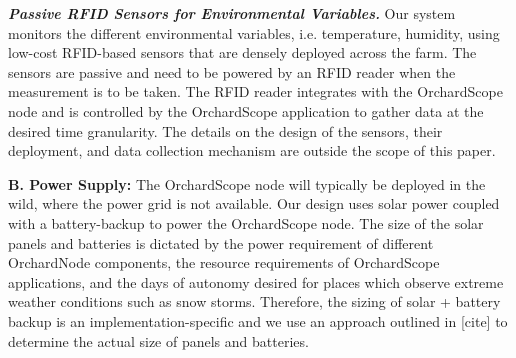 


\noindent
\textbf{\textit{Passive RFID Sensors for Environmental Variables.}} Our system monitors the different environmental variables, i.e. temperature, humidity, using low-cost RFID-based sensors that are densely deployed across the farm. The sensors are passive and need to be powered by an RFID reader when the measurement is to be taken. The RFID reader integrates with the OrchardScope node and is controlled by the OrchardScope application to gather data at the desired time granularity. The details on the design of the sensors, their deployment, and data collection mechanism are outside the scope of this paper. 


\noindent
\textbf{B. Power Supply:}
The OrchardScope node will typically be deployed in the wild, where the power grid is not available. Our design uses solar power coupled with a battery-backup to power the OrchardScope node. The size of the solar panels and batteries is dictated by the power requirement of different OrchardNode components, the resource requirements of OrchardScope applications, and the days of autonomy desired for places which observe extreme weather conditions such as snow storms. Therefore, the sizing of solar + battery backup is an implementation-specific and we use an approach outlined in [cite] to determine the actual size of panels and batteries. 

